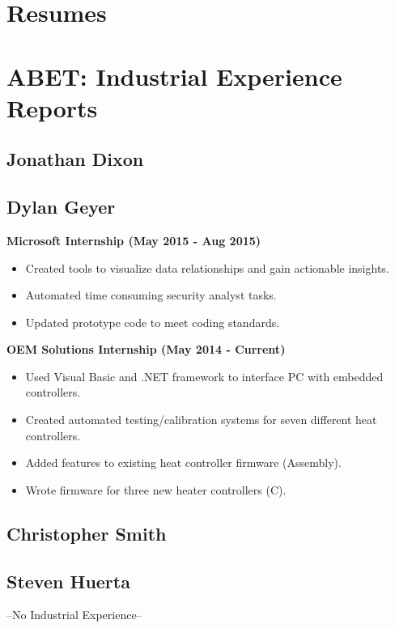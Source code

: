 

\section{Resumes}



	 
     
     
     
          

\section{ABET:  Industrial Experience Reports}

\subsection{Jonathan Dixon}

% 

\subsection{Dylan Geyer}
\large{\textbf{Microsoft Internship (May 2015 - Aug 2015)}}
\begin{itemize}
	\item Created tools to visualize data relationships and gain actionable insights.
	\item Automated time consuming security analyst tasks.
	\item Updated prototype code to meet coding standards.
\end{itemize}
\large{\textbf{OEM Solutions Internship (May 2014 - Current)}}
\begin{itemize}
	\item Used Visual Basic and .NET framework to interface PC with embedded controllers.
	\item Created automated testing/calibration systems for seven different heat controllers.
	\item Added features to existing heat controller firmware (Assembly).
	\item Wrote firmware for three new heater controllers (C).
\end{itemize}
% 

\subsection{Christopher Smith}

% 

\subsection{Steven Huerta}
--No Industrial Experience--
